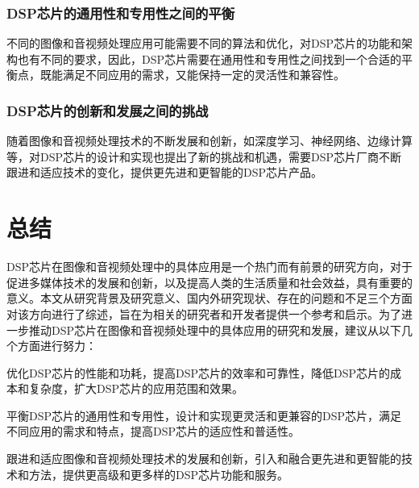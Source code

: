 \documentclass{math201}
\begin{document}
\subsubsection{DSP芯片的通用性和专用性之间的平衡}

不同的图像和音视频处理应用可能需要不同的算法和优化，对DSP芯片的功能和架构也有不同的要求，因此，DSP芯片需要在通用性和专用性之间找到一个合适的平衡点，既能满足不同应用的需求，又能保持一定的灵活性和兼容性。

\subsubsection{DSP芯片的创新和发展之间的挑战}

随着图像和音视频处理技术的不断发展和创新，如深度学习、神经网络、边缘计算等，对DSP芯片的设计和实现也提出了新的挑战和机遇，需要DSP芯片厂商不断跟进和适应技术的变化，提供更先进和更智能的DSP芯片产品。

\section{总结}

DSP芯片在图像和音视频处理中的具体应用是一个热门而有前景的研究方向，对于促进多媒体技术的发展和创新，以及提高人类的生活质量和社会效益，具有重要的意义。本文从研究背景及研究意义、国内外研究现状、存在的问题和不足三个方面对该方向进行了综述，旨在为相关的研究者和开发者提供一个参考和启示。为了进一步推动DSP芯片在图像和音视频处理中的具体应用的研究和发展，建议从以下几个方面进行努力：

优化DSP芯片的性能和功耗，提高DSP芯片的效率和可靠性，降低DSP芯片的成本和复杂度，扩大DSP芯片的应用范围和效果。

平衡DSP芯片的通用性和专用性，设计和实现更灵活和更兼容的DSP芯片，满足不同应用的需求和特点，提高DSP芯片的适应性和普适性。

跟进和适应图像和音视频处理技术的发展和创新，引入和融合更先进和更智能的技术和方法，提供更高级和更多样的DSP芯片功能和服务。




\end{document}
